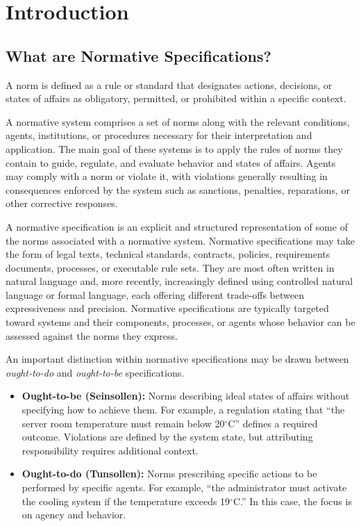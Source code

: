 
\chapter{Introduction}

\section{What are Normative Specifications?}

A norm is defined as a rule or standard that designates actions, decisions, or states of affairs as obligatory, permitted, or prohibited within a specific context. 

A normative system comprises a set of norms along with the relevant conditions, agents, institutions, or procedures necessary for their interpretation and application. The main goal of these systems is to apply the rules of norms they contain to guide, regulate, and evaluate behavior and states of affairs. Agents may comply with a norm or violate it, with violations generally resulting in consequences enforced by the system such as sanctions, penalties, reparations, or other corrective responses.

A normative specification is an explicit and structured representation of some of the norms associated with a normative system. Normative specifications may take the form of legal texts, technical standards, contracts, policies, requirements documents, processes, or executable rule sets. They are most often written in natural language and, more recently, increasingly defined using controlled natural language or formal language, each offering different trade-offs between expressiveness and precision. Normative specifications are typically targeted toward systems and their components, processes, or agents whose behavior can be assessed against the norms they express.

An important distinction within normative specifications may be drawn between \emph{ought-to-do} and \emph{ought-to-be} specifications. 

\begin{itemize}

    \item \textbf{Ought-to-be (Seinsollen):} Norms describing ideal states of affairs without specifying how to achieve them. For example, a regulation stating that ``the server room temperature must remain below 20$^{\circ}$C'' defines a required outcome. Violations are defined by the system state, but attributing responsibility requires additional context.

    \item \textbf{Ought-to-do (Tunsollen):} Norms prescribing specific actions to be performed by specific agents. For example, ``the administrator must activate the cooling system if the temperature exceeds 19$^{\circ}$C.'' In this case, the focus is on agency and behavior. 

\end{itemize}

